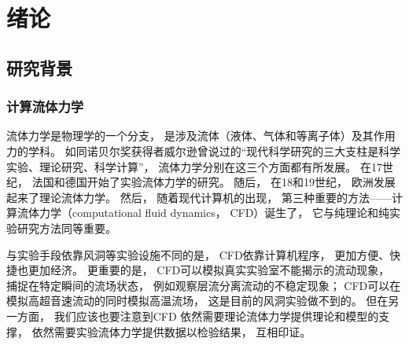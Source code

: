 \chapter{绪论}

\section{研究背景}

\subsection{计算流体力学}

流体力学是物理学的一个分支，
是涉及流体（液体、气体和等离子体）及其作用力的学科。
如同诺贝尔奖获得者威尔逊曾说过的“现代科学研究的三大支柱是科学实验、理论研究、科学计算”，
流体力学分别在这三个方面都有所发展。
在17世纪，
法国和德国开始了实验流体力学的研究。
随后，
在18和19世纪，
欧洲发展起来了理论流体力学。
然后，
随着现代计算机的出现，
第三种重要的方法——计算流体力学（computational fluid dynamics，
CFD）诞生了，
它与纯理论和纯实验研究方法同等重要。

与实验手段依靠风洞等实验设施不同的是，
CFD依靠计算机程序，
更加方便、快捷也更加经济。
更重要的是，
CFD可以模拟真实实验室不能揭示的流动现象，
捕捉在特定瞬间的流场状态，
例如观察层流分离流动的不稳定现象；
CFD可以在模拟高超音速流动的同时模拟高温流场，
这是目前的风洞实验做不到的。
但在另一方面，
我们应该也要注意到CFD
依然需要理论流体力学提供理论和模型的支撑，
依然需要实验流体力学提供数据以检验结果，
互相印证。

